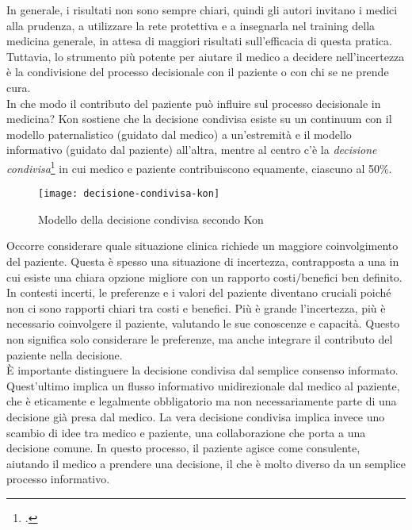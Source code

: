 In generale, i risultati non sono sempre chiari, quindi gli autori invitano i medici alla prudenza, a utilizzare la rete protettiva e a insegnarla nel training della medicina generale, in attesa di maggiori risultati sull'efficacia di questa pratica. Tuttavia, lo strumento più potente per aiutare il medico a decidere nell'incertezza è la condivisione del processo decisionale con il paziente o con chi se ne prende cura.\\

In che modo il contributo del paziente può influire sul processo decisionale in medicina? Kon sostiene che la decisione condivisa esiste su un continuum con il modello paternalistico (guidato dal medico) a un'estremità e il modello informativo (guidato dal paziente) all'altra, mentre al centro c'è la \textit{decisione condivisa}\footcite{womak:decisione-condivisa-kon} in cui medico e paziente contribuiscono equamente, ciascuno al 50\%.\\


\begin{figure}[!ht] 
    \centering 
    \texttt{[image: decisione-condivisa-kon]} 
    \caption{Modello della decisione condivisa secondo Kon}
\end{figure}

Occorre considerare quale situazione clinica richiede un maggiore coinvolgimento del paziente. Questa è spesso una situazione di incertezza, contrapposta a una in cui esiste una chiara opzione migliore con un rapporto costi/benefici ben definito. In contesti incerti, le preferenze e i valori del paziente diventano cruciali poiché non ci sono rapporti chiari tra costi e benefici. Più è grande l'incertezza, più è necessario coinvolgere il paziente, valutando le sue conoscenze e capacità. Questo non significa solo considerare le preferenze, ma anche integrare il contributo del paziente nella decisione.\\

È importante distinguere la decisione condivisa dal semplice consenso informato. Quest'ultimo implica un flusso informativo unidirezionale dal medico al paziente, che è eticamente e legalmente obbligatorio ma non necessariamente parte di una decisione già presa dal medico. La vera decisione condivisa implica invece uno scambio di idee tra medico e paziente, una collaborazione che porta a una decisione comune. In questo processo, il paziente agisce come consulente, aiutando il medico a prendere una decisione, il che è molto diverso da un semplice processo informativo.


